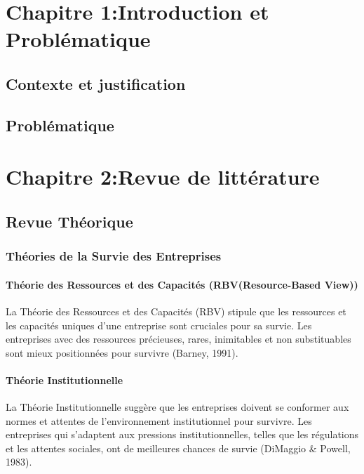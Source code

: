 \documentclass[a4paper,12pt]{report}
\begin{document}
\chapter*{Chapitre 1:Introduction et Problématique}
\setcounter{section}{0}

\section{Contexte et justification}


\section{Problématique}



\chapter*{Chapitre 2:Revue de littérature}
\setcounter{section}{0}
\section{Revue Théorique}
\subsection{Théories de la Survie des Entreprises}
\subsubsection{Théorie des Ressources et des Capacités (RBV(Resource-Based View))}
La Théorie des Ressources et des Capacités (RBV) stipule que les ressources et les capacités uniques d’une entreprise sont cruciales pour sa survie. Les entreprises avec des ressources précieuses, rares, inimitables et non substituables sont mieux positionnées pour survivre (Barney, 1991).
\subsubsection{Théorie Institutionnelle}
La Théorie Institutionnelle suggère que les entreprises doivent se conformer aux normes et attentes de l’environnement institutionnel pour survivre. Les entreprises qui s'adaptent aux pressions institutionnelles, telles que les régulations et les attentes sociales, ont de meilleures chances de survie (DiMaggio \& Powell, 1983).
\end{document}
